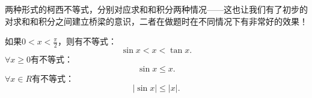 两种形式的柯西不等式，分别对应求和和积分两种情况——这也让我们有了初步的对求和和积分之间建立桥梁的意识，二者在做题时在不同情况下有非常好的效果！

\begin{proposition}
	如果$0<x<\frac{\pi}{2}$，则有不等式：
	\begin{equation}
		\sin{x}<x<\tan{x}.
	\end{equation}
		$\forall x\geq 0$有不等式：
	\begin{equation}
		\sin{x}\leq x.
	\end{equation}
	$\forall x\in R$有不等式：
	\begin{equation}
		|\sin{x}|\leq |x|.
	\end{equation}
\end{proposition}


